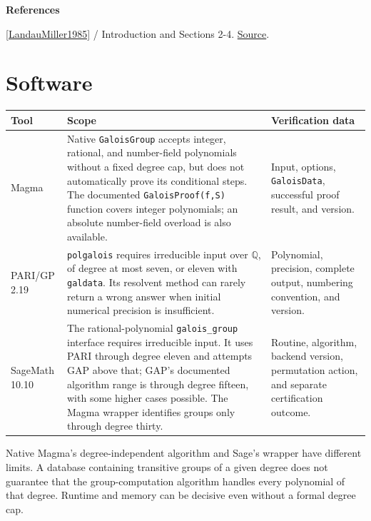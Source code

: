 \documentclass[11pt,a4paper,oneside,openany]{book}
\newenvironment{sources}{\par\smallskip\begingroup\footnotesize\color{atlasgray}\leftskip=10pt\setlength{\parskip}{2pt}}{\par\endgroup\smallskip}
\begin{document}
\begin{sources}
\textbf{References}\par\smallskip
\noindent\hyperlink{ref:LandauMiller1985}{[LandauMiller1985]} / Introduction and Sections 2-4.  \href{https://doi.org/10.1016/0022-0000(85)90013-3}{Source}.\par
\end{sources}\color{black}
\section{Software}
\begin{center}\small\begin{tabularx}{\linewidth}{@{}>{\raggedright\arraybackslash}X>{\raggedright\arraybackslash}X>{\raggedright\arraybackslash}X@{}}\toprule
\textbf{Tool} & \textbf{Scope} & \textbf{Verification data} \\
\midrule
Magma & Native \texttt{GaloisGroup} accepts integer, rational, and number-field polynomials without a fixed degree cap, but does not automatically prove its conditional steps. The documented \texttt{GaloisProof(f,S)} function covers integer polynomials; an absolute number-field overload is also available. & Input, options, \texttt{GaloisData}, successful proof result, and version. \\
PARI/GP 2.19 & \texttt{polgalois} requires irreducible input over \(\mathbb Q\), of degree at most seven, or eleven with \texttt{galdata}. Its resolvent method can rarely return a wrong answer when initial numerical precision is insufficient. & Polynomial, precision, complete output, numbering convention, and version. \\
SageMath 10.10 & The rational-polynomial \texttt{galois\_\allowbreak{}group} interface requires irreducible input. It uses PARI through degree eleven and attempts GAP above that; GAP's documented algorithm range is through degree fifteen, with some higher cases possible. The Magma wrapper identifies groups only through degree thirty. & Routine, algorithm, backend version, permutation action, and separate certification outcome. \\
\bottomrule\end{tabularx}\end{center}
\color{black} Native Magma's degree-independent algorithm and Sage's wrapper have different limits. A database containing transitive groups of a given degree does not guarantee that the group-computation algorithm handles every polynomial of that degree. Runtime and memory can be decisive even without a formal degree cap.\par
\end{document}
